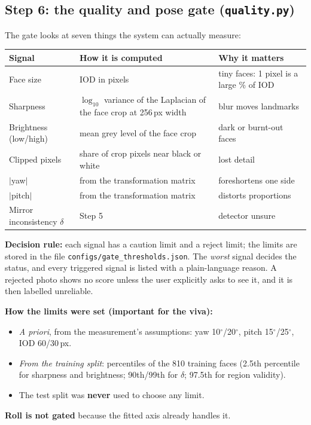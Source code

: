 \subsection{Step 6: the quality and pose gate (\texttt{quality.py})}
The gate looks at seven things the system can actually measure:
\begin{center}\small
\begin{tabular}{@{}p{3.4cm}p{6.6cm}p{5.4cm}@{}}
\toprule
Signal & How it is computed & Why it matters\\
\midrule
Face size & IOD in pixels & tiny faces: 1 pixel is a large \% of IOD\\
Sharpness & $\log_{10}$ variance of the Laplacian of the face crop at 256\,px width & blur moves landmarks\\
Brightness (low/high) & mean grey level of the face crop & dark or burnt-out faces\\
Clipped pixels & share of crop pixels near black or white & lost detail\\
$|$yaw$|$ & from the transformation matrix & foreshortens one side\\
$|$pitch$|$ & from the transformation matrix & distorts proportions\\
Mirror inconsistency $\delta$ & Step 5 & detector unsure\\
\bottomrule
\end{tabular}
\end{center}
\textbf{Decision rule:} each signal has a caution limit and a reject limit; the limits are
stored in the file \texttt{configs/gate\_thresholds.json}. The \emph{worst} signal decides the
status, and every triggered signal is listed with a plain-language reason. A rejected photo
shows no score unless the user explicitly asks to see it, and it is then labelled unreliable.

\textbf{How the limits were set (important for the viva):}
\begin{itemize}
\item \emph{A priori}, from the measurement's assumptions: yaw 10$^\circ$/20$^\circ$, pitch
15$^\circ$/25$^\circ$, IOD 60/30\,px.
\item \emph{From the training split}: percentiles of the 810 training faces (2.5th
percentile for sharpness and brightness; 90th/99th for $\delta$; 97.5th for region validity).
\item The test split was \textbf{never} used to choose any limit.
\end{itemize}
\textbf{Roll is not gated} because the fitted axis already handles it.

